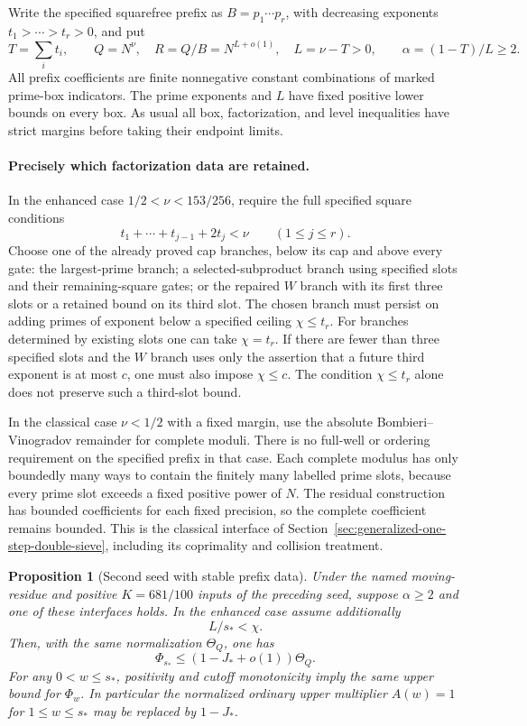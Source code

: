 \documentclass[11pt]{article}
\newtheorem{proposition}[theorem]{Proposition}
\begin{document}
Write the specified squarefree prefix as $B=p_1\cdots p_r$, with
decreasing exponents $t_1>\cdots>t_r>0$, and put
\[
 T=\sum_i t_i,\qquad Q=N^\nu,\quad R=Q/B=N^{L+o(1)},\quad
 L=\nu-T>0,\qquad \alpha=(1-T)/L\ge2.
\]
All prefix coefficients are finite nonnegative constant combinations
of marked prime-box indicators.  The prime exponents and $L$ have
fixed positive lower bounds on every box.  As usual all box,
factorization, and level inequalities have strict margins before
taking their endpoint limits.

\paragraph{Precisely which factorization data are retained.}
In the enhanced case $1/2<\nu<153/256$, require the full specified
square conditions
\[
 t_1+\cdots+t_{j-1}+2t_j<\nu\qquad(1\le j\le r).
\]
Choose one of the already proved cap branches, below its cap and
above every gate: the largest-prime branch; a selected-subproduct
branch using specified slots and their remaining-square gates; or
the repaired $W$ branch with its first three slots or a retained
bound on its third slot.  The chosen branch must persist on adding
primes of exponent below a specified ceiling $\chi\le t_r$.
For branches determined by existing slots one can take $\chi=t_r$.
If there are fewer than three specified slots and the $W$ branch
uses only the assertion that a future third exponent is at most
$c$, one must also impose $\chi\le c$.  The condition
$\chi\le t_r$ alone does not preserve such a third-slot bound.

In the classical case $\nu<1/2$ with a fixed margin, use the absolute
Bombieri--Vinogradov remainder for complete moduli.  There is no
full-well or ordering requirement on the specified prefix in that
case.  Each complete modulus has only boundedly many ways to contain
the finitely many labelled prime slots, because every prime slot
exceeds a fixed positive power of $N$.  The residual construction
has bounded coefficients for each fixed precision, so the complete
coefficient remains bounded.  This is the classical interface of
Section~\ref{sec:generalized-one-step-double-sieve}, including its
coprimality and collision treatment.

\begin{proposition}[Second seed with stable prefix data]
\label{prop:second-seed-stable-prefix}
Under the named moving-residue and positive $K=681/100$ inputs of
the preceding seed, suppose $\alpha\ge2$ and one of these interfaces
holds.  In the enhanced case assume additionally
\begin{equation}\label{eq:second-seed-comparison-cutoff}
 L/s_*<\chi.
\end{equation}
Then, with the same normalization $\Theta_Q$, one has
\[
 \Phi_{s_*}\le(1-J_*+o(1))\Theta_Q.
\]
For any $0<w\le s_*$, positivity and cutoff monotonicity imply the
same upper bound for $\Phi_w$.  In particular the normalized ordinary
upper multiplier $A(w)=1$ for $1\le w\le s_*$ may be replaced by
$1-J_*$.
\end{proposition}
\end{document}
